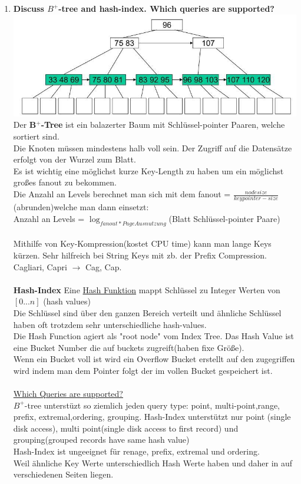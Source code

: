 \documentclass[12pt]{article}\pagestyle{myheadings}
\theoremstyle{plain}
\begin{document}
\begin{enumerate}
\item \textbf{Discuss $B^+$-tree and hash-index. Which queries are supported?}\\
\includegraphics[scale=0.7]{BplusTree.jpg}
Der \textbf{B$^+$-Tree} ist ein balazerter Baum mit Schlüssel-pointer Paaren, welche sortiert sind.\\
Die Knoten müssen mindestens halb voll sein.
Der Zugriff auf die Datensätze erfolgt von der Wurzel zum Blatt.\\
Es ist wichtig eine möglichst kurze Key-Length zu haben um ein möglichst großes fanout zu bekommen.\\
Die Anzahl an Levels berechnet man sich mit dem fanout = $\frac{nodesize}{keypointer-size}$ (abrunden)welche man dann einsetzt:\\
Anzahl an Levels = $\log_{fanout*Page Ausnutzung}$(Blatt Schlüssel-pointer Paare)\\
\\Mithilfe von Key-Kompression(kostet CPU time) kann man lange Keys kürzen.
Sehr hilfreich bei String Keys mit zb. der Prefix Compression.\\Cagliari, Capri $\rightarrow$ Cag, Cap.\\ \\
\textbf{Hash-Index} Eine \underline{Hash Funktion} mappt Schlüssel zu Integer Werten von $[0...n]$ (hash values)\\
Die Schlüssel sind über den ganzen Bereich verteilt und ähnliche Schlüssel haben oft trotzdem sehr unterschiedliche hash-values.\\
Die Hash Function agiert als "root node" vom Index Tree. Das Hash Value ist eine Bucket Number die auf buckets zugreift(haben fixe Größe).\\ Wenn ein Bucket voll ist wird ein Overflow Bucket erstellt auf den zugegriffen wird indem man dem Pointer folgt der im vollen Bucket gespeichert ist.\\ \\
\underline{Which Queries are supported?}\\
$B^+$-tree unterstüzt so ziemlich jeden query type: point, multi-point,range, prefix, extremal,ordering, grouping.
Hash-Index unterstützt nur point (single disk access), multi point(single disk access to first record) und grouping(grouped records have same hash value)\\
Hash-Index ist ungeeignet  für renage, prefix, extremal und ordering.\\
Weil ähnliche Key Werte unterschiedlich Hash Werte haben und daher in auf verschiedenen Seiten liegen.\\




\end{enumerate}
\end{document}
